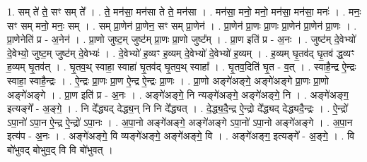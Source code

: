 \documentclass[17pt]{extarticle}
\begin{document}
1. सम् ते॑ ते॒ सꣳ सम् ते᳚ । . ते॒ मन॑सा॒ मन॑सा ते ते॒ मन॑सा । . मन॑सा॒ मनो॒ मनो॒ मन॑सा॒ मन॑सा॒ मनः॑ । . मनः॒ सꣳ सम् मनो॒ मनः॒ सम् । . सम् प्रा॒णेन॑ प्रा॒णेन॒ सꣳ सम् प्रा॒णेन॑ । . प्रा॒णेन॑ प्रा॒णः प्रा॒णः प्रा॒णेन॑ प्रा॒णेन॑ प्रा॒णः । . प्रा॒णेनेति॑ प्र - अ॒नेन॑ । . प्रा॒णो जुष्ट॒म् जुष्ट॑म् प्रा॒णः प्रा॒णो जुष्ट᳚म् । . प्रा॒ण इति॑ प्र - अ॒नः । . जुष्ट॑म् दे॒वेभ्यो॑ दे॒वेभ्यो॒ जुष्ट॒म् जुष्ट॑म् दे॒वेभ्यः॑ । . दे॒वेभ्यो॑ ह॒व्यꣳ ह॒व्यम् दे॒वेभ्यो॑ दे॒वेभ्यो॑ ह॒व्यम् । . ह॒व्यम् घृ॒तव॑द् घृ॒तव॑ द्ध॒व्यꣳ ह॒व्यम् घृ॒तव॑त् । . घृ॒तव॒थ् स्वाहा॒ स्वाहा॑ घृ॒तव॑द् घृ॒तव॒थ् स्वाहा᳚ । . घृ॒तव॒दिति॑ घृ॒त - व॒त् । . स्वाहै॒न्द्र ऐ॒न्द्रः स्वाहा॒ स्वाहै॒न्द्रः । . ऐ॒न्द्रः प्रा॒णः प्रा॒ण ऐ॒न्द्र ऐ॒न्द्रः प्रा॒णः । . प्रा॒णो अङ्गे॑अङ्गे॒ अङ्गे॑अङ्गे प्रा॒णः प्रा॒णो अङ्गे॑अङ्गे । . प्रा॒ण इति॑ प्र - अ॒नः । . अङ्गे॑अङ्गे॒ नि न्यङ्गे॑अङ्गे॒ अङ्गे॑अङ्गे॒ नि । . अङ्गे॑अङ्ग॒ इत्यङ्गे᳚ - अ॒ङ्गे॒ । . नि दे᳚द्ध्यद् देद्ध्य॒न् नि नि दे᳚द्ध्यत् । . दे॒द्ध्य॒दै॒न्द्र ऐ॒न्द्रो दे᳚द्ध्यद् देद्ध्यदै॒न्द्रः । . ऐ॒न्द्रो॑ ऽपा॒नो॑ ऽपा॒न ऐ॒न्द्र ऐ॒न्द्रो॑ ऽपा॒नः । . अ॒पा॒नो अङ्गे॑अङ्गे॒ अङ्गे॑अङ्गे ऽपा॒नो॑ ऽपा॒नो अङ्गे॑अङ्गे । . अ॒पा॒न इत्य॑प - अ॒नः । . अङ्गे॑अङ्गे॒ वि व्यङ्गे॑अङ्गे॒ अङ्गे॑अङ्गे॒ वि । . अङ्गे॑अङ्ग॒ इत्यङ्गे᳚ - अ॒ङ्गे॒ । . वि बो॑भुवद् बोभुव॒द् वि वि बो॑भुवत् । \newline
\end{document}
